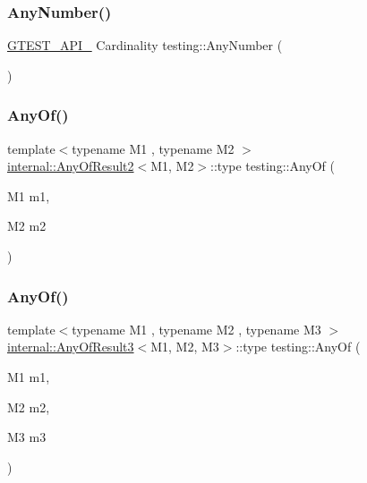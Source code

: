 \mbox{\label{namespacetesting_aa1f8a6371097e1e9b8d6866020f35252}} 
\subsubsection{\texorpdfstring{AnyNumber()}{AnyNumber()}}
{\footnotesize\ttfamily \mbox{\hyperlink{gtest-port_8h_aa73be6f0ba4a7456180a94904ce17790}{G\+T\+E\+S\+T\+\_\+\+A\+P\+I\+\_\+}} Cardinality testing\+::\+Any\+Number (\begin{DoxyParamCaption}{ }\end{DoxyParamCaption})}

\mbox{\label{namespacetesting_a81cfefd9f75cdce827d5bc873cf73aac}} 
\subsubsection{\texorpdfstring{AnyOf()}{AnyOf()}\hspace{0.1cm}{\footnotesize\ttfamily [1/9]}}
{\footnotesize\ttfamily template$<$typename M1 , typename M2 $>$ \\
\mbox{\hyperlink{structtesting_1_1internal_1_1AnyOfResult2}{internal\+::\+Any\+Of\+Result2}}$<$M1, M2$>$\+::type testing\+::\+Any\+Of (\begin{DoxyParamCaption}\item[{M1}]{m1,  }\item[{M2}]{m2 }\end{DoxyParamCaption})\hspace{0.3cm}{\ttfamily [inline]}}

\mbox{\label{namespacetesting_a3ccbde3ba01189587676d44a4333c0a5}} 
\subsubsection{\texorpdfstring{AnyOf()}{AnyOf()}\hspace{0.1cm}{\footnotesize\ttfamily [2/9]}}
{\footnotesize\ttfamily template$<$typename M1 , typename M2 , typename M3 $>$ \\
\mbox{\hyperlink{structtesting_1_1internal_1_1AnyOfResult3}{internal\+::\+Any\+Of\+Result3}}$<$M1, M2, M3$>$\+::type testing\+::\+Any\+Of (\begin{DoxyParamCaption}\item[{M1}]{m1,  }\item[{M2}]{m2,  }\item[{M3}]{m3 }\end{DoxyParamCaption})\hspace{0.3cm}{\ttfamily [inline]}}

